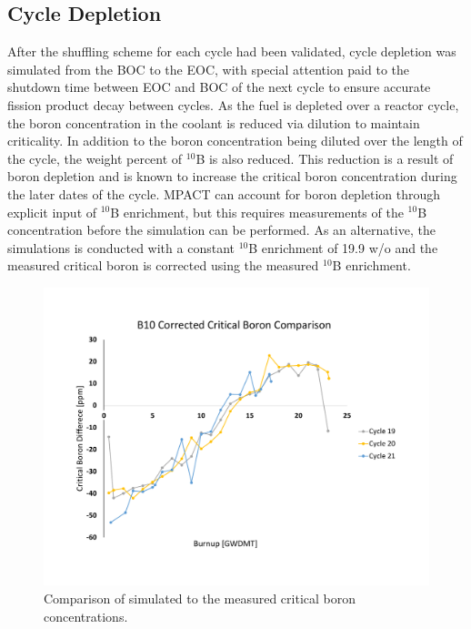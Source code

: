 \documentclass[edeposit,fullpage,11pt]{uiucthesis2009}
\begin{document}
\subsection{Cycle Depletion}
After the shuffling scheme for each cycle had been validated, cycle depletion was simulated from the \gls{BOC} to the \gls{EOC}, with special attention paid to the shutdown time between \gls{EOC} and \gls{BOC} of the next cycle to ensure accurate fission product decay between cycles. 
As the fuel is depleted over a reactor cycle, the boron concentration in the coolant is reduced via dilution to maintain criticality. 
In addition to the boron concentration being diluted over the length of the cycle, the weight percent of $^{10}$B is also reduced. 
This reduction is a result of boron depletion and is known to increase the critical boron concentration during the later dates of the cycle. 
MPACT can account for boron depletion through explicit input of $^{10}$B enrichment, but this requires measurements of the $^{10}$B concentration before the simulation can be performed.
As an alternative, the simulations is conducted with a constant $^{10}$B enrichment of 19.9 w/o and the measured critical boron is corrected using the measured $^{10}$B enrichment.
\begin{figure}
\begin{center}
\includegraphics[trim={0 2cm 0 3.1cm},clip,width=0.85\linewidth]{./Figures/corr_b.pdf}
\end{center}
\caption{Comparison of simulated to the measured critical boron concentrations.}
\label{fig:cor_b}
\end{figure} 
\end{document}
